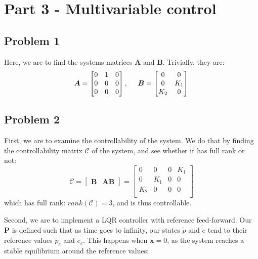 \section{Part 3 - Multivariable control}
\subsection{Problem 1}
Here, we are to find the systems matrices $\boldsymbol{A}$ and $\boldsymbol{B}$. Trivially, they are:
\begin{equation}
  \boldsymbol{A} = \begin{bmatrix}
    0 & 1 & 0 \\
    0 & 0 & 0 \\
    0 & 0 & 0 \\
  \end{bmatrix}, \hspace{0.5cm}
  \boldsymbol{B} = \begin{bmatrix}
    0 & 0 \\
    0 & K_1 \\
    K_2 & 0 \\
  \end{bmatrix}
\end{equation}

\subsection{Problem 2}
First, we are to examine the controllability of the system. We do that by finding the controllability matrix $\boldsymbol{\mathcal{C}}$ of the system, and see whether it has full rank or not:
\begin{equation}
  \boldsymbol{\mathcal{C}} = \begin{bmatrix}
    \boldsymbol{B} & \boldsymbol{AB}
  \end{bmatrix}
  =
  \begin{bmatrix}
    0 & 0 & 0 & K_1 \\
    0 & K_1 & 0 & 0 \\
    K_2 & 0 & 0 & 0 \\
  \end{bmatrix}
\end{equation}
which has full rank: $rank(\boldsymbol{\mathcal{C}}) = 3$, and is thus
controllable.

Second, we are to implement a LQR controller with reference feed-forward. Our $\boldsymbol{P}$ is defined such that as time goes to infinity, our states $\tilde{p}$ and $\tilde{\dot{e}}$ tend to their reference values $\tilde{p}_c$ and $\tilde{\dot{e}}_c$. This happens when
$\dot{\boldsymbol{x}} = 0$, as the system reaches a stable equilibrium
around the reference values:

